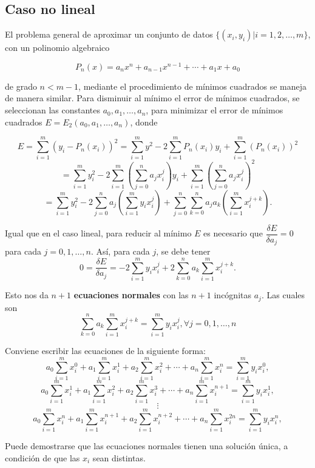 \subsection{Caso no lineal}
El problema general de aproximar un conjunto de datos $\{(x_i, y_i)| i=1,2,\dots,m\}$, con un polinomio algebraico

$$P_n(x) = a_nx^n + a_{n-1}x^{n-1} + \cdots + a_1x + a_0$$

de grado $n<m-1$, mediante el procedimiento de mínimos cuadrados se maneja de manera similar. Para disminuir al mínimo el error de 
mínimos cuadrados, se seleccionan las constantes $a_0, a_1, \dots, a_n$, para minimizar el error de mínimos cuadrados $E = E_2(a_0, a_1, \dots, a_n)$,
donde

$$E = \sum_{i=1}^{m} (y_i - P_n(x_i))^2 = \sum_{i=1}^{m} y^2 - 2\sum_{i=1}^m P_n(x_i)y_i + \sum_{i=1}^m (P_n(x_i))^2$$
$$ = \sum_{i=1}^m y_i^2 - 2\sum_{i=1}^m \left( \sum_{j=0}^n a_jx_i^j\right)y_i + \sum_{i=1}^m \left( \sum_{j=0}^n a_jx_i^j \right)^2$$
$$ = \sum_{i=1}^m y_i^2 - 2\sum_{j=0}^n a_j \left( \sum_{i=1}^m y_ix_i^j \right) + \sum_{j=0}^n \sum_{k=0}^n a_ja_k \left( \sum_{i=1}^m x_i^{j+k} \right).$$

Igual que en el caso lineal, para reducir al mínimo $E$ es necesario que $\displaystyle{\dfrac{\delta E}{\delta a_j}}=0$ para cada $j=0,1,\dots, n$. Así, para 
cada $j$, se debe tener
$$0 = \dfrac{\delta E}{\delta a_j} = -2\sum_{i=1}^m y_ix_i^j + 2\sum_{k=0}^n a_k \sum_{i=1}^m x_i^{j+k}.$$

Esto nos da $n+1$ \textbf{ecuaciones normales} con las $n+1$ incógnitas $a_j$. Las cuales son
\begin{equation}
  \sum_{k=0}^n a_k \sum_{i=1}^m x_i^{j+k} = \sum_{i=1}^m y_ix_i^j,  \forall  j=0,1,\dots, n
  \label{eq:minimosCuadrados4}
\end{equation}

Conviene escribir las ecuaciones de la siguiente forma:
$$a_0\sum_{i=1}^m x_i^0 + a_1\sum_{i=1}^m x_i^1 + a_2\sum_{i=1}^m x_i^2 + \cdots + a_n\sum_{i=1}^m x_i^n = \sum_{i=1}^m y_ix_i^0,$$
$$a_0\sum_{i=1}^m x_i^1 + a_1\sum_{i=1}^m x_i^2 + a_2\sum_{i=1}^m x_i^3 + \cdots + a_n\sum_{i=1}^m x_i^{n+1} = \sum_{i=1}^m y_ix_i^1,$$
$$\vdots$$
$$a_0\sum_{i=1}^m x_i^n + a_1\sum_{i=1}^m x_i^{n+1} + a_2\sum_{i=1}^m x_i^{n+2} + \cdots + a_n\sum_{i=1}^m x_i^{2n} = \sum_{i=1}^m y_ix_i^n,$$

Puede demostrarse que las ecuaciones normales tienen una solución única, a condición de que las $x_i$ sean distintas.


